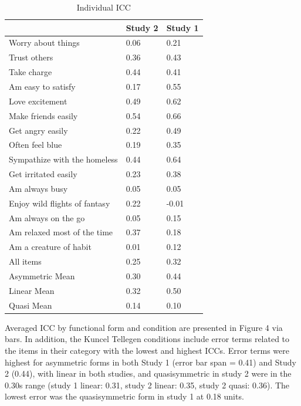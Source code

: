 \documentclass[
  ,jou]{apa6}
\begin{document}
\begin{table}[tbp]

\begin{center}
\begin{threeparttable}

\caption{\label{tab:Table 3}Individual ICC}

\begin{tabular}{lll}
\toprule
 & \multicolumn{1}{c}{Study 2} & \multicolumn{1}{c}{Study 1}\\
\midrule
Worry about things & 0.06 & 0.21\\
Trust others & 0.36 & 0.43\\
Take charge & 0.44 & 0.41\\
Am easy to satisfy & 0.17 & 0.55\\
Love excitement & 0.49 & 0.62\\
Make friends easily & 0.54 & 0.66\\
Get angry easily & 0.22 & 0.49\\
Often feel blue & 0.19 & 0.35\\
Sympathize with the homeless & 0.44 & 0.64\\
Get irritated easily & 0.23 & 0.38\\
Am always busy & 0.05 & 0.05\\
Enjoy wild flights of fantasy & 0.22 & -0.01\\
Am always on the go & 0.05 & 0.15\\
Am relaxed most of the time & 0.37 & 0.18\\
Am a creature of habit & 0.01 & 0.12\\
All items & 0.25 & 0.32\\
Asymmetric Mean & 0.30 & 0.44\\
Linear Mean & 0.32 & 0.50\\
Quasi Mean & 0.14 & 0.10\\
\bottomrule
\end{tabular}

\end{threeparttable}
\end{center}

\end{table}

Averaged ICC by functional form and condition are presented in Figure 4 via bars. In addition, the Kuncel Tellegen conditions include error terms related to the items in their category with the lowest and highest ICCs. Error terms were highest for asymmetric forms in both Study 1 (error bar span = 0.41) and Study 2 (0.44), with linear in both studies, and quasisymmetric in study 2 were in the 0.30s range (study 1 linear: 0.31, study 2 linear: 0.35, study 2 quasi: 0.36). The lowest error was the quasisymmetric form in study 1 at 0.18 units.
\end{document}
